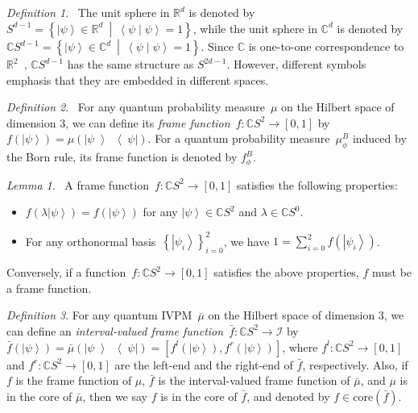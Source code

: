 \documentclass{article}
\theoremstyle{remark}
\newtheorem{definition}{Definition}
\newtheorem{lemma}{Lemma}
\newcommand{\ket}[1]{{\left\vert{#1}\right\rangle}}
\newcommand{\op}[2]{\ensuremath{\left\vert{#1}\middle\rangle\middle\langle{#2}\right\vert}}
\newcommand{\proj}[1]{\op{#1}{#1}}
\newcommand{\ip}[2]{\ensuremath{\left\langle{#1}\middle\vert{#2}\right\rangle}}
\newcommand{\set}[2]{\ensuremath{\left\{ {#1}~\middle|~{#2}\right\} }}
\begin{document}
\begin{definition}\cite{Hatcher2001,dryden2005}~The unit sphere
in $\mathbb{R}^{d}$ is denoted by $S^{d-1}=\set{\ket{\psi}\in\mathbb{R}^{d}}{\ip{\psi}{\psi}=1}$,
while the unit sphere in $\mathbb{C}^{d}$ is denoted by $\mathbb{C}S^{d-1}=\set{\ket{\psi}\in\mathbb{C}^{d}}{\ip{\psi}{\psi}=1}$.
Since $\mathbb{C}$ is one-to-one correspondence to $\mathbb{R}^{2}$~\cite{GAMELIN2003},
$\mathbb{C}S^{d-1}$ has the same structure as $S^{2d-1}$. However,
different symbols emphasis that they are embedded in different spaces.\end{definition}

\begin{definition}\cite{gleason1957,peres1995quantum,RichmanBridges1999}~For
any quantum probability measure~$\mu$ on the Hilbert space of dimension
3, we can define its \emph{frame function}~$f:\mathbb{C}S^{2}\rightarrow\left[0,1\right]$
by $f\left(\ket{\psi}\right)=\mu\left(\proj{\psi}\right)$. For a
quantum probability measure~$\mu_{\phi}^{B}$ induced by the Born
rule, its frame function is denoted by $f_{\phi}^{B}$.\end{definition}

\begin{lemma}\cite{gleason1957,peres1995quantum,RichmanBridges1999}~A
frame function~$f:\mathbb{C}S^{2}\rightarrow\left[0,1\right]$ satisfies
the following properties:
\begin{itemize}
\item $f\left(\lambda\ket{\psi}\right)=f\left(\ket{\psi}\right)$ for any
$\ket{\psi}\in\mathbb{C}S^{2}$ and $\lambda\in\mathbb{C}S^{0}$.
\item For any orthonormal basis~$\left\{ \ket{\psi_{i}}\right\} _{i=0}^{2}$,
we have $1=\sum_{i=0}^{2}f\left(\ket{\psi_{i}}\right)$.
\end{itemize}
Conversely, if a function~$f:\mathbb{C}S^{2}\rightarrow\left[0,1\right]$
satisfies the above properties, $f$ must be a frame function.\end{lemma}

\begin{definition}For any quantum IVPM~$\bar{\mu}$ on the Hilbert
space of dimension 3, we can define an \emph{interval-valued frame
function}~$\bar{f}:\mathbb{C}S^{2}\rightarrow\mathscr{I}$ by $\bar{f}\left(\ket{\psi}\right)=\bar{\mu}\left(\proj{\psi}\right)=\left[f^{l}\left(\ket{\psi}\right),f^{r}\left(\ket{\psi}\right)\right]$,
where $f^{l}:\mathbb{C}S^{2}\rightarrow\left[0,1\right]$ and $f^{r}:\mathbb{C}S^{2}\rightarrow\left[0,1\right]$
are the left-end and the right-end of $\bar{f}$, respectively. Also,
if $f$ is the frame function of $\mu$, $\bar{f}$ is the interval-valued
frame function of $\bar{\mu}$, and $\mu$ is in the core of $\bar{\mu}$,
then we say $f$ is in the core of $\bar{f}$, and denoted by $f\in\mathrm{core}\left(\bar{f}\right)$.\end{definition}
\end{document}
